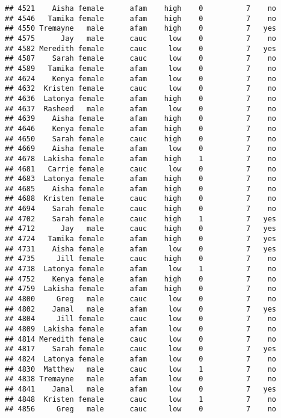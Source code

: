\documentclass[
]{article}
\begin{document}
\begin{verbatim}
## 4521    Aisha female      afam    high    0          7    no
## 4546   Tamika female      afam    high    0          7    no
## 4550 Tremayne   male      afam    high    0          7   yes
## 4575      Jay   male      cauc     low    0          7    no
## 4582 Meredith female      cauc     low    0          7   yes
## 4587    Sarah female      cauc     low    0          7    no
## 4589   Tamika female      afam     low    0          7    no
## 4624    Kenya female      afam     low    0          7    no
## 4632  Kristen female      cauc     low    0          7    no
## 4636  Latonya female      afam    high    0          7    no
## 4637  Rasheed   male      afam     low    0          7    no
## 4639    Aisha female      afam    high    0          7    no
## 4646    Kenya female      afam    high    0          7    no
## 4650    Sarah female      cauc    high    0          7    no
## 4669    Aisha female      afam     low    0          7    no
## 4678  Lakisha female      afam    high    1          7    no
## 4681   Carrie female      cauc     low    0          7    no
## 4683  Latonya female      afam    high    0          7    no
## 4685    Aisha female      afam    high    0          7    no
## 4688  Kristen female      cauc    high    0          7    no
## 4694    Sarah female      cauc    high    0          7    no
## 4702    Sarah female      cauc    high    1          7   yes
## 4712      Jay   male      cauc    high    0          7   yes
## 4724   Tamika female      afam    high    0          7   yes
## 4731    Aisha female      afam     low    0          7   yes
## 4735     Jill female      cauc    high    0          7    no
## 4738  Latonya female      afam     low    1          7    no
## 4752    Kenya female      afam    high    0          7    no
## 4759  Lakisha female      afam    high    0          7    no
## 4800     Greg   male      cauc     low    0          7    no
## 4802    Jamal   male      afam     low    0          7   yes
## 4804     Jill female      cauc     low    0          7    no
## 4809  Lakisha female      afam     low    0          7    no
## 4814 Meredith female      cauc     low    0          7    no
## 4817    Sarah female      cauc     low    0          7   yes
## 4824  Latonya female      afam     low    0          7    no
## 4830  Matthew   male      cauc     low    1          7    no
## 4838 Tremayne   male      afam     low    0          7    no
## 4841    Jamal   male      afam     low    0          7   yes
## 4848  Kristen female      cauc     low    1          7    no
## 4856     Greg   male      cauc     low    0          7    no

\end{verbatim}
\end{document}
